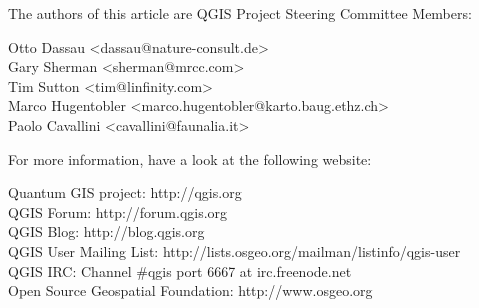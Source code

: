 
The authors of this article are QGIS Project Steering Committee Members:

Otto Dassau <dassau@nature-consult.de>  
\\Gary Sherman <sherman@mrcc.com>
\\Tim Sutton <tim@linfinity.com>
\\Marco Hugentobler <marco.hugentobler@karto.baug.ethz.ch>
\\Paolo Cavallini <cavallini@faunalia.it>


For more information, have a look at the following website:

Quantum GIS project: http://qgis.org
\\QGIS Forum: http://forum.qgis.org
\\QGIS Blog: http://blog.qgis.org
\\QGIS User Mailing List: http://lists.osgeo.org/mailman/listinfo/qgis-user
\\QGIS IRC: Channel \#qgis port 6667 at irc.freenode.net
\\Open Source Geospatial Foundation: http://www.osgeo.org
 


 



